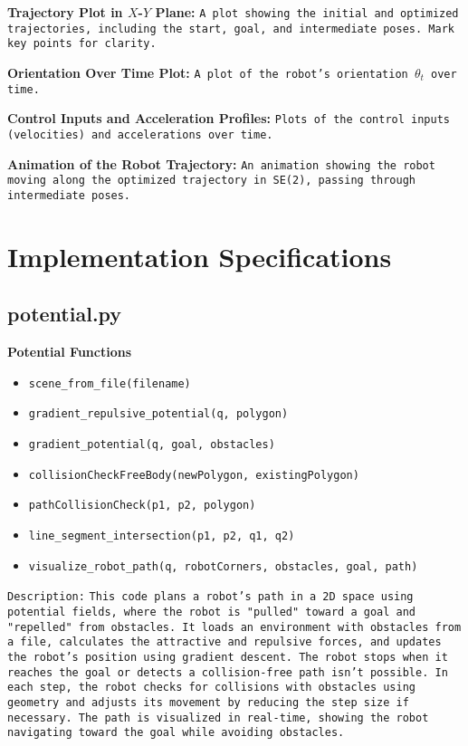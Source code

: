 \documentclass{article}
\begin{document}
\textbf{\newline Trajectory Plot in \( X \)-\( Y \) Plane:} 
\texttt{A plot showing the initial and optimized trajectories, including the start, goal, and intermediate poses. Mark key points for clarity.}

\textbf{\newline Orientation Over Time Plot:} 
\texttt{A plot of the robot's orientation \( \theta_t \) over time.}

\textbf{\newline Control Inputs and Acceleration Profiles:} 
\texttt{Plots of the control inputs (velocities) and accelerations over time.}

\textbf{\newline Animation of the Robot Trajectory:} 
\texttt{An animation showing the robot moving along the optimized trajectory in SE(2), passing through intermediate poses.}




\section*{Implementation Specifications}
\subsection*{potential.py}
\bfseries{Potential Functions}
\begin{itemize}
    \item \texttt{scene\_from\_file(filename)}
    \item \texttt{gradient\_repulsive\_potential(q, polygon)}
    \item \texttt{gradient\_potential(q, goal, obstacles)}
    \item \texttt{collisionCheckFreeBody(newPolygon, existingPolygon)}
    \item \texttt{pathCollisionCheck(p1, p2, polygon)}
    \item \texttt{line\_segment\_intersection(p1, p2, q1, q2)}
    \item \texttt{visualize\_robot\_path(q, robotCorners, obstacles, goal, path)}
\end{itemize}
\texttt{Description:}
\texttt{This code plans a robot's path in a 2D space using potential fields, where the robot is "pulled" toward a goal and "repelled" from obstacles. It loads an environment with obstacles from a file, calculates the attractive and repulsive forces, and updates the robot’s position using gradient descent. The robot stops when it reaches the goal or detects a collision-free path isn't possible.
In each step, the robot checks for collisions with obstacles using geometry and adjusts its movement by reducing the step size if necessary. The path is visualized in real-time, showing the robot navigating toward the goal while avoiding obstacles.}
\end{document}
